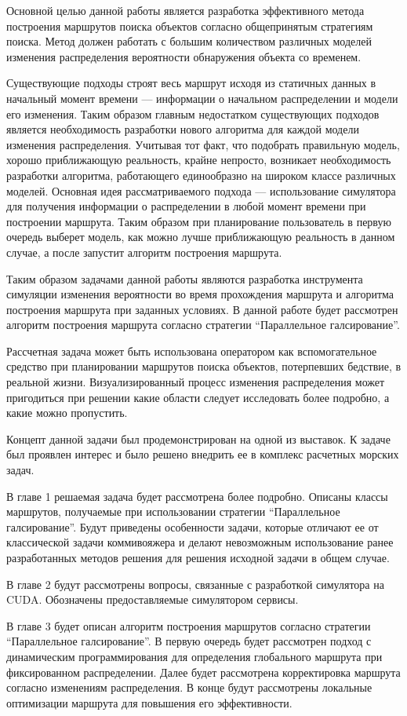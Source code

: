 \startprefacepage

Основной целью данной работы является разработка эффективного метода построения маршрутов поиска
объектов согласно общепринятым стратегиям поиска. Метод должен работать с большим количеством
различных моделей изменения распределения вероятности обнаружения объекта со временем. %
 
 Существующие подходы строят весь маршрут исходя из статичных данных в начальный момент
времени --- информации о начальном распределении и модели его изменения.
Таким образом главным недостатком существующих подходов является необходимость
разработки нового алгоритма для каждой модели изменения распределения.
Учитывая тот факт, что подобрать правильную модель, хорошо приближающую реальность,
 крайне непросто, возникает необходимость разработки алгоритма,
 работающего единообразно на широком классе различных моделей.
 Основная идея рассматриваемого подхода --- использование симулятора для получения %
 информации о распределении в любой момент времени при построении маршрута.
 Таким образом при планирование пользователь в первую очередь выберет модель,
 как можно лучше приближающую реальность в данном случае, а после запустит
 алгоритм построения маршрута.

 Таким образом задачами данной работы являются разработка инструмента симуляции изменения
вероятности во время прохождения маршрута и алгоритма построения маршрута при заданных условиях.
В данной работе будет рассмотрен алгоритм построения маршрута согласно
 стратегии ``Параллельное галсирование''.

Рассчетная задача может быть использована оператором как вспомогательное средство
при планировании маршрутов поиска объектов, потерпевших бедствие, в реальной жизни.
Визуализированный процесс изменения распределения может пригодиться при решении какие области
следует исследовать более подробно, а какие можно пропустить.

Концепт данной задачи был продемонстрирован на одной из выставок. К задаче был проявлен 
интерес и было решено внедрить ее в комплекс расчетных морских задач. %

В главе 1 решаемая задача будет рассмотрена более подробно.
 Описаны классы маршрутов, получаемые при использовании стратегии ``Параллельное галсирование''. 
Будут приведены особенности задачи, которые отличают ее от классической задачи коммивояжера
 и делают невозможным использование ранее разработанных методов решения
 для решения исходной задачи в общем случае.

В главе 2 будут рассмотрены вопросы, связанные с разработкой симулятора на CUDA.
 Обозначены предоставляемые симулятором сервисы.

В главе 3 будет описан алгоритм построения маршрутов согласно стратегии ``Параллельное галсирование''.
В первую очередь будет рассмотрен подход с динамическим программирования для определения
глобального маршрута при фиксированном распределении. Далее будет рассмотрена корректировка маршрута
согласно изменениям распределения. В конце будут рассмотрены локальные оптимизации маршрута
для повышения его эффективности.

\FloatBarrier

